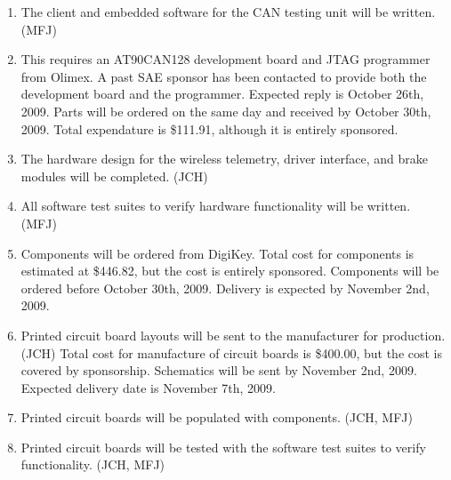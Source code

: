 \begin{enumerate}

\item The client and embedded software for the CAN testing unit will be written. (MFJ)

\item This requires an AT90CAN128 development board and JTAG programmer from Olimex. A past SAE sponsor has been contacted to provide both the development board and the programmer. Expected reply is October 26th, 2009. Parts will be ordered on the same day and received by October 30th, 2009. Total expendature is \$111.91, although it is entirely sponsored.

\item The hardware design for the wireless telemetry, driver interface, and brake modules will be completed. (JCH)

\item All software test suites to verify hardware functionality will be written. (MFJ) 

\item Components will be ordered from DigiKey. Total cost for components is estimated at \$446.82, but the cost is entirely sponsored. Components will be ordered before October 30th, 2009. Delivery is expected by November 2nd, 2009.

\item Printed circuit board layouts will be sent to the manufacturer for production. (JCH) Total cost for manufacture of circuit boards is \$400.00, but the cost is covered by sponsorship. Schematics will be sent by November 2nd, 2009. Expected delivery date is November 7th, 2009.

\item Printed circuit boards will be populated with components. (JCH, MFJ)
\item Printed circuit boards will be tested with the software test suites to verify functionality. (JCH, MFJ)

\end{enumerate}



